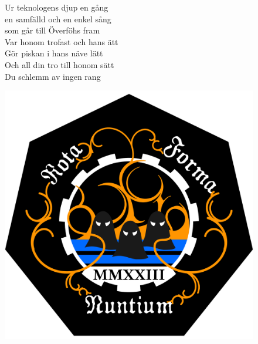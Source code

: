 \documentclass[a6paper, 10pt, twoside]{article}
\begin{document}
\noindent
\begin{center}
\end{center}
\vspace{-15pt}
\begin{lyrics}
\begin{figure}[!h]
\begin{minipage}{0.60\linewidth}
\small Ur teknologens djup en gång\\
en samfälld och en enkel sång\\
som går till Överföhs fram
\vspace{5pt}\\
Var honom trofast och hans ätt\\
Gör piskan i hans näve lätt\\
Och all din tro till honom sätt\\
Du schlemm av ingen rang
\end{minipage}
\begin{minipage}{0.38\linewidth}
\includegraphics[width=\textwidth]{loggan.png}
\end{minipage}
\end{figure}
\end{lyrics}
\vspace{-10pt}
\vspace{10pt}
\end{document}
